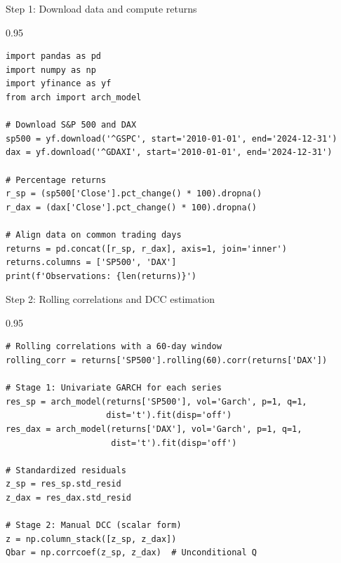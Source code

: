 \documentclass[9pt, aspectratio=169, t]{beamer}
\begin{document}
\begin{frame}[fragile]{Step 1: Download data and compute returns}
    \begin{cminipage}{0.95\textwidth}
\begin{lstlisting}
import pandas as pd
import numpy as np
import yfinance as yf
from arch import arch_model

# Download S&P 500 and DAX
sp500 = yf.download('^GSPC', start='2010-01-01', end='2024-12-31')
dax = yf.download('^GDAXI', start='2010-01-01', end='2024-12-31')

# Percentage returns
r_sp = (sp500['Close'].pct_change() * 100).dropna()
r_dax = (dax['Close'].pct_change() * 100).dropna()

# Align data on common trading days
returns = pd.concat([r_sp, r_dax], axis=1, join='inner')
returns.columns = ['SP500', 'DAX']
print(f'Observations: {len(returns)}')
\end{lstlisting}
    \end{cminipage}
\end{frame}

\begin{frame}[fragile]{Step 2: Rolling correlations and DCC estimation}
    \begin{cminipage}{0.95\textwidth}
\begin{lstlisting}
# Rolling correlations with a 60-day window
rolling_corr = returns['SP500'].rolling(60).corr(returns['DAX'])

# Stage 1: Univariate GARCH for each series
res_sp = arch_model(returns['SP500'], vol='Garch', p=1, q=1,
                    dist='t').fit(disp='off')
res_dax = arch_model(returns['DAX'], vol='Garch', p=1, q=1,
                     dist='t').fit(disp='off')

# Standardized residuals
z_sp = res_sp.std_resid
z_dax = res_dax.std_resid

# Stage 2: Manual DCC (scalar form)
z = np.column_stack([z_sp, z_dax])
Qbar = np.corrcoef(z_sp, z_dax)  # Unconditional Q
\end{lstlisting}
    \end{cminipage}
\end{frame}
\end{document}
